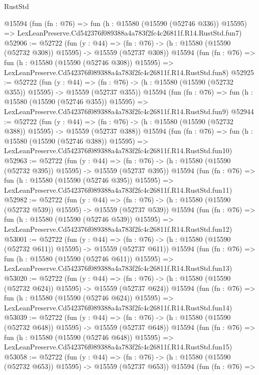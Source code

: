 \begin{lexlean}{RustStd}
\begin{coremodule}
    @15594
    (fun (fn : @76) =>
    fun (h : @15580 (@15590 (@52746 @336)) @15595) =>
    LexLeanPreserve.Cd542376f089388a4a783f2fc4c26811f.R14.RustStd.fun7)
@52906 := @52722
    (fun (y : @44) =>
    (fn : @76) -> (h : @15580 (@15590 (@52732 @308)) @15595) -> @15559 (@52737 @308))
    @15594
    (fun (fn : @76) =>
    fun (h : @15580 (@15590 (@52746 @308)) @15595) =>
    LexLeanPreserve.Cd542376f089388a4a783f2fc4c26811f.R14.RustStd.fun8)
@52925 := @52722
    (fun (y : @44) =>
    (fn : @76) -> (h : @15580 (@15590 (@52732 @355)) @15595) -> @15559 (@52737 @355))
    @15594
    (fun (fn : @76) =>
    fun (h : @15580 (@15590 (@52746 @355)) @15595) =>
    LexLeanPreserve.Cd542376f089388a4a783f2fc4c26811f.R14.RustStd.fun9)
@52944 := @52722
    (fun (y : @44) =>
    (fn : @76) -> (h : @15580 (@15590 (@52732 @388)) @15595) -> @15559 (@52737 @388))
    @15594
    (fun (fn : @76) =>
    fun (h : @15580 (@15590 (@52746 @388)) @15595) =>
    LexLeanPreserve.Cd542376f089388a4a783f2fc4c26811f.R14.RustStd.fun10)
@52963 := @52722
    (fun (y : @44) =>
    (fn : @76) -> (h : @15580 (@15590 (@52732 @395)) @15595) -> @15559 (@52737 @395))
    @15594
    (fun (fn : @76) =>
    fun (h : @15580 (@15590 (@52746 @395)) @15595) =>
    LexLeanPreserve.Cd542376f089388a4a783f2fc4c26811f.R14.RustStd.fun11)
@52982 := @52722
    (fun (y : @44) =>
    (fn : @76) -> (h : @15580 (@15590 (@52732 @539)) @15595) -> @15559 (@52737 @539))
    @15594
    (fun (fn : @76) =>
    fun (h : @15580 (@15590 (@52746 @539)) @15595) =>
    LexLeanPreserve.Cd542376f089388a4a783f2fc4c26811f.R14.RustStd.fun12)
@53001 := @52722
    (fun (y : @44) =>
    (fn : @76) -> (h : @15580 (@15590 (@52732 @611)) @15595) -> @15559 (@52737 @611))
    @15594
    (fun (fn : @76) =>
    fun (h : @15580 (@15590 (@52746 @611)) @15595) =>
    LexLeanPreserve.Cd542376f089388a4a783f2fc4c26811f.R14.RustStd.fun13)
@53020 := @52722
    (fun (y : @44) =>
    (fn : @76) -> (h : @15580 (@15590 (@52732 @624)) @15595) -> @15559 (@52737 @624))
    @15594
    (fun (fn : @76) =>
    fun (h : @15580 (@15590 (@52746 @624)) @15595) =>
    LexLeanPreserve.Cd542376f089388a4a783f2fc4c26811f.R14.RustStd.fun14)
@53039 := @52722
    (fun (y : @44) =>
    (fn : @76) -> (h : @15580 (@15590 (@52732 @648)) @15595) -> @15559 (@52737 @648))
    @15594
    (fun (fn : @76) =>
    fun (h : @15580 (@15590 (@52746 @648)) @15595) =>
    LexLeanPreserve.Cd542376f089388a4a783f2fc4c26811f.R14.RustStd.fun15)
@53058 := @52722
    (fun (y : @44) =>
    (fn : @76) -> (h : @15580 (@15590 (@52732 @653)) @15595) -> @15559 (@52737 @653))
    @15594
    (fun (fn : @76) =>

\end{coremodule}
\end{lexlean}
